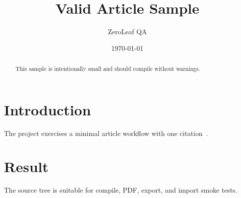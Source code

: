 \documentclass{article}
\title{Valid Article Sample}
\author{ZeroLeaf QA}
\date{\today}
\begin{document}
\maketitle

\begin{abstract}
This sample is intentionally small and should compile without warnings.
\end{abstract}

\section{Introduction}
The project exercises a minimal article workflow with one citation~\cite{sample2026}.

\section{Result}
The source tree is suitable for compile, PDF, export, and import smoke tests.



\end{document}
